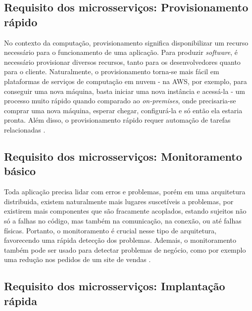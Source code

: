 
\subsection{Requisito dos microsserviços: Provisionamento rápido}\label{boas-praticas-provisionamento-rapido}

No contexto da computação, provisionamento significa disponibilizar um recurso necessário para o funcionamento de uma aplicação. Para produzir \emph{software}, é necessário provisionar diversos recursos, tanto para os desenvolvedores quanto para o cliente. Naturalmente, o provisionamento torna-se mais fácil em plataformas de serviços de computação em nuvem - na AWS, por exemplo, para conseguir uma nova máquina, basta iniciar uma nova instância e acessá-la - um processo muito rápido quando comparado ao \emph{on-premises}, onde precisaria-se comprar uma nova máquina, esperar chegar, configurá-la e só então ela estaria pronta. Além disso, o provisionamento rápido requer automação de tarefas relacionadas \cite{martin-fowler-microservice-prereq}.

\subsection{Requisito dos microsserviços: Monitoramento básico}\label{boas-praticas-monitoramento-basico}

Toda aplicação precisa lidar com erros e problemas, porém em uma arquitetura distribuida, existem naturalmente mais lugares suscetíveis a problemas, por existirem mais componentes que são fracamente acoplados, estando sujeitos não só a falhas no código, mas também na comunicação, na conexão, ou até falhas físicas. Portanto, o monitoramento é crucial nesse tipo de arquitetura, favorecendo uma rápida detecção dos problemas. Ademais, o monitoramento também pode ser usado para detectar problemas de negócio, como por exemplo uma redução nos pedidos de um site de vendas \cite{martin-fowler-microservice-prereq}.

\subsection{Requisito dos microsserviços: Implantação rápida}\label{boas-praticas-implantacao-rapida}

